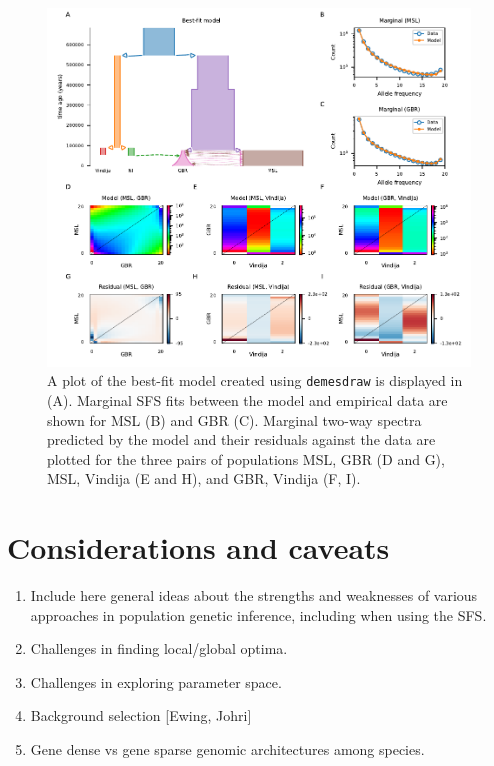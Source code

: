 \documentclass[]{article}
\newcommand{\demesdraw}{\texttt{demesdraw}\xspace}
\begin{document}
\begin{figure}[t!]
    \includegraphics{../example2/fig2.pdf}
    \caption{
      A plot of the best-fit model created using \demesdraw is displayed in (A).
      Marginal SFS fits between the model and empirical data are shown for MSL (B) and GBR (C).
      Marginal two-way spectra predicted by the model and their residuals against the data are plotted for the three pairs of populations MSL, GBR (D and G), MSL, Vindija (E and H), and GBR, Vindija (F, I).
    }
    \label{fig:humans}
\end{figure}


\section*{Considerations and caveats}\label{sec:conclusions}

\begin{enumerate}
    \item Include here general ideas about the strengths and weaknesses of
        various approaches in population genetic inference, including when
        using the SFS.
    \item Challenges in finding local/global optima.
    \item Challenges in exploring parameter space.
    \item Background selection [Ewing, Johri]
    \item Gene dense vs gene sparse genomic architectures among species.
\end{enumerate}



\end{document}
